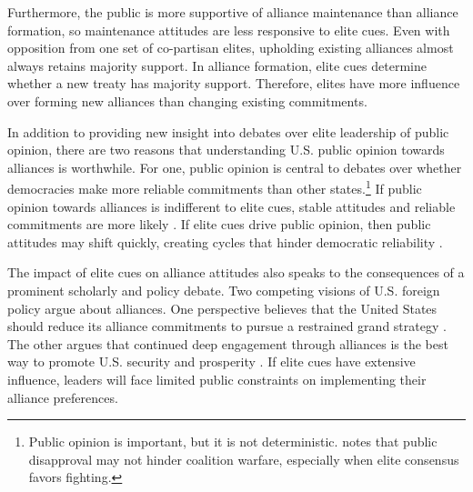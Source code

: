 \documentclass[12pt]{article}
\begin{document}
Furthermore, the public is more supportive of alliance maintenance than alliance formation, so maintenance attitudes are less responsive to elite cues. 
Even with opposition from one set of co-partisan elites, upholding existing alliances almost always retains majority support. 
In alliance formation, elite cues determine whether a new treaty has majority support. 
Therefore, elites have more influence over forming new alliances than changing existing commitments. 


In addition to providing new insight into debates over elite leadership of public opinion, there are two reasons that understanding U.S. public opinion towards alliances is worthwhile. 
For one, public opinion is central to debates over whether democracies make more reliable commitments than other states.\footnote{Public opinion is important, but it is not deterministic. \citet{Kreps2010} notes that public disapproval may not hinder coalition warfare, especially when elite consensus favors fighting.} 
If public opinion towards alliances is indifferent to elite cues, stable attitudes and reliable commitments are more likely \citep{Gaubatz1996}.
If elite cues drive public opinion, then public attitudes may shift quickly, creating cycles that hinder democratic reliability \citep{GartzkeGleditsch2004}.


The impact of elite cues on alliance attitudes also speaks to the consequences of a prominent scholarly and policy debate. 
Two competing visions of U.S. foreign policy argue about alliances. 
One perspective believes that the United States should reduce its alliance commitments to pursue a restrained grand strategy \citep{Preble2009, Posen2014}.
The other argues that continued deep engagement through alliances is the best way to promote U.S. security and prosperity \citep{Brooksetal2013, BrandsFeaver2017}. 
If elite cues have extensive influence, leaders will face limited public constraints on implementing their alliance preferences. 
\end{document}
